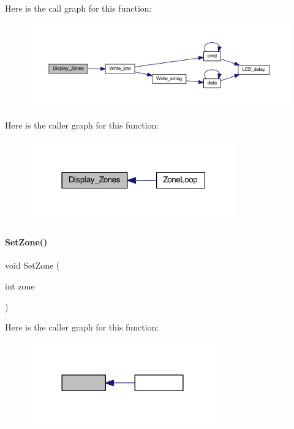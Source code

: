Here is the call graph for this function\+:
\nopagebreak
\begin{figure}[H]
\begin{center}
\leavevmode
\includegraphics[width=350pt]{a00059_a444b4ddad4c861dcfe350158ffe5d854_cgraph}
\end{center}
\end{figure}
Here is the caller graph for this function\+:
\nopagebreak
\begin{figure}[H]
\begin{center}
\leavevmode
\includegraphics[width=255pt]{a00059_a444b4ddad4c861dcfe350158ffe5d854_icgraph}
\end{center}
\end{figure}
\mbox{\label{a00059_aac9584e7c43e5e7dfe6f740d2e52a545}} 
\paragraph{Set\+Zone()}
{\footnotesize\ttfamily void Set\+Zone (\begin{DoxyParamCaption}\item[{int}]{zone }\end{DoxyParamCaption})}

Here is the caller graph for this function\+:
\nopagebreak
\begin{figure}[H]
\begin{center}
\leavevmode
\includegraphics[width=228pt]{a00059_aac9584e7c43e5e7dfe6f740d2e52a545_icgraph}
\end{center}
\end{figure}
\mbox{\label{a00059_aefe3a1f3ce1ce2aef86b493a3331bf2e}} 
